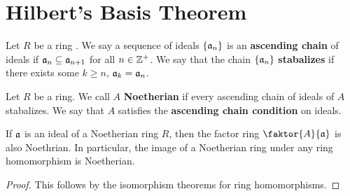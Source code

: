 \section{Hilbert's Basis Theorem}

\begin{definition}
    Let $R$ be a ring . We say a sequence of ideals $\{\mathfrak{a}_n\}$ is an
    \textbf{ascending chain} of ideals if $\mathfrak{a}_n \subseteq \mathfrak{a}_{n+1}$ for all
    $n \in \mathbb{Z}^+$. We say that the chain  $\{\mathfrak{a}_n\}$ \textbf{stabalizes} if there
    exists some $k \geq n$, $\mathfrak{a}_k=\mathfrak{a}_n$.
\end{definition}

\begin{definition}
    Let $R$ be a ring. We call $A$ \textbf{Noetherian} if every ascending chain
    of ideals of $A$ stabalizes. We say that $A$ satisfies the \textbf{ascending
    chain condition} on ideals.
\end{definition}

\begin{lemma}\label{1.4.1}
    If $\mathfrak{a}$ is an ideal of a Noetherian ring $R$, then the factor ring
    $\faktor{A}{\af}$ is also Noethrian. In particular, the image of a Noetherian
    ring under any ring homomorphism is Noetherian.
\end{lemma}
\begin{proof}
    This follows by the isomorphism theorems for ring homomorphisms.
\end{proof}


